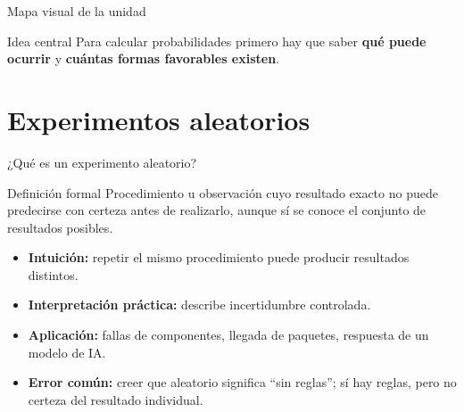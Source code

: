 \documentclass[aspectratio=169,11pt]{beamer}
\newcommand{\errorcomun}[1]{\textbf{Error común:} #1}
\newcommand{\intuicion}[1]{\textbf{Intuición:} #1}
\begin{document}
\begin{frame}{Mapa visual de la unidad}
\centering
{}
\vspace{0.4em}
\begin{alertblock}{Idea central}
Para calcular probabilidades primero hay que saber \textbf{qué puede ocurrir} y \textbf{cuántas formas favorables existen}.
\end{alertblock}
\end{frame}

\section{Experimentos aleatorios}

\begin{frame}{¿Qué es un experimento aleatorio?}
\begin{block}{Definición formal}
Procedimiento u observación cuyo resultado exacto no puede predecirse con certeza antes de realizarlo, aunque sí se conoce el conjunto de resultados posibles.
\end{block}
\pause
\begin{itemize}
  \item \intuicion{repetir el mismo procedimiento puede producir resultados distintos.}
  \item \textbf{Interpretación práctica:} describe incertidumbre controlada.
  \item \textbf{Aplicación:} fallas de componentes, llegada de paquetes, respuesta de un modelo de IA.
  \item \errorcomun{creer que aleatorio significa ``sin reglas''; sí hay reglas, pero no certeza del resultado individual.}
\end{itemize}
\end{frame}
\end{document}
